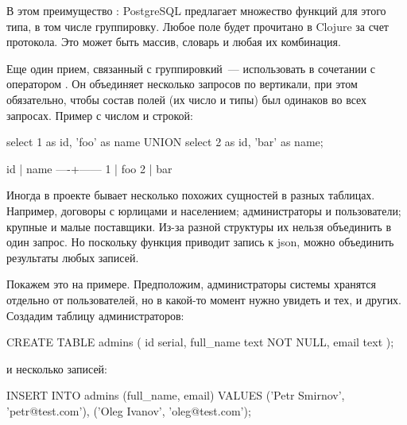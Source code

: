 В этом преимущество : PostgreSQL предлагает множество функций для этого типа, в том числе группировку. Любое поле  будет прочитано в Clojure за счет протокола. Это может быть массив, словарь и любая их комбинация.

Еще один прием, связанный с группировкий~--- использовать  в сочетании с оператором . Он объединяет несколько запросов по вертикали, при этом обязательно, чтобы состав полей (их число и типы) был одинаков во всех запросах. Пример с числом и строкой:

\begin{english}
  \begin{sql}
select 1 as id, 'foo' as name
UNION
select 2 as id, 'bar' as name;
  \end{sql}
\end{english}

\begin{english}
  \begin{text}
 id | name
----+------
  1 | foo
  2 | bar
  \end{text}
\end{english}

Иногда в проекте бывает несколько похожих сущностей в разных таблицах. Например, договоры с юрлицами и населением; администраторы и пользователи; крупные и малые поставщики. Из-за разной структуры их нельзя объединить в один запрос. Но поскольку функция  приводит запись к json, можно объединить результаты любых записей.

Покажем это на примере. Предположим, администраторы системы хранятся отдельно от пользователей, но в какой-то момент нужно увидеть и тех, и других. Создадим таблицу администраторов:

\begin{english}
  \begin{sql}
CREATE TABLE admins (
  id serial,
  full_name text NOT NULL,
  email text
);
  \end{sql}
\end{english}

и несколько записей:

\begin{english}
  \begin{sql}
INSERT INTO admins (full_name, email)
VALUES ('Petr Smirnov', 'petr@test.com'),
       ('Oleg Ivanov', 'oleg@test.com');
  \end{sql}
\end{english}

